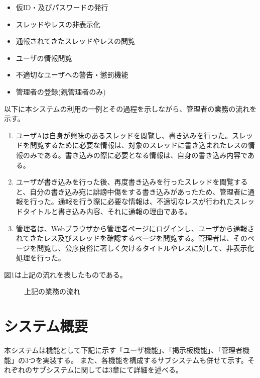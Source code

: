 \documentclass[a4j]{jarticle}
\begin{document}
\begin{itemize}
  \item 仮ID・及びパスワードの発行
  \item スレッドやレスの非表示化
  \item 通報されてきたスレッドやレスの閲覧
  \item ユーザの情報閲覧
  \item 不適切なユーザへの警告・懲罰機能
  \item 管理者の登録(親管理者のみ)
\end{itemize}





以下に本システムの利用の一例とその過程を示しながら、管理者の業務の流れを示す。

\begin{enumerate}
  \item ユーザAは自身が興味のあるスレッドを閲覧し、書き込みを行った。スレッドを閲覧するために必要な情報は、対象のスレッドに書き込まれたレスの情報のみである。書き込みの際に必要となる情報は、自身の書き込み内容である。

  \item  ユーザが書き込みを行った後、再度書き込みを行ったスレッドを閲覧すると、自分の書き込み宛に誹謗中傷をする書き込みがあったため、管理者に通報を行った。通報を行う際に必要な情報は、不適切なレスが行われたスレッドタイトルと書き込み内容、それに通報の理由である。
  \item  管理者は、Webブラウザから管理者ページにログインし、ユーザから通報されてきたレス及びスレッドを確認するページを閲覧する。管理者は、そのページを閲覧し、公序良俗に著しく欠けるタイトルやレスに対して、非表示化処理を行った。
\end{enumerate}

図1は上記の流れを表したものである。


\begin{figure}[H]
\begin{center}
\caption{上記の業務の流れ}
\label{fig:figuretest}
\end{center}
\end{figure}














\section{システム概要}
本システムは機能として下記に示す「ユーザ機能」、「掲示板機能」、「管理者機能」の3つを実装する。
 また、各機能を構成するサブシステムも併せて示す。それぞれのサブシステムに関しては3章にて詳細を述べる。
\end{document}
